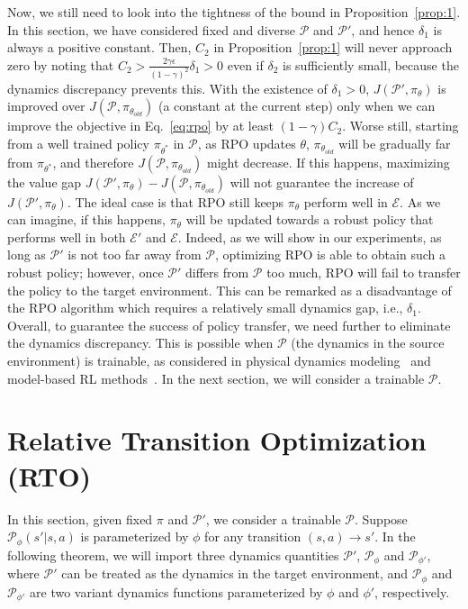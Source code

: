 \documentclass[letterpaper]{article} %
\def\P{{\mathcal{P}}}
\begin{document}
Now, we still need to look into the tightness of the bound in Proposition~\ref{prop:1}. In this section, we have considered fixed and diverse $\P$ and $\P'$, and hence $\delta_1$ is always a positive constant. Then, $C_2$ in Proposition~\ref{prop:1} will never approach zero by noting that $C_2>\frac{2\gamma\epsilon}{(1-\gamma)^2}\delta_1>0$ even if $\delta_2$ is sufficiently small, because the dynamics discrepancy prevents this. With the existence of $\delta_1>0$, $J(\P',\pi_{\theta})$ is improved over $J(\P,\pi_{\theta_{old}})$ (a constant at the current step) only when we can improve the objective in Eq.~\eqref{eq:rpo} by at least $(1-\gamma)C_2$.
Worse still, starting from a well trained policy $\pi_{\theta^*}$ in $\P$, as RPO updates $\theta$, $\pi_{\theta_{old}}$ will be gradually far from $\pi_{\theta^*}$, and therefore $J(\P,\pi_{\theta_{old}})$ might decrease. If this happens, maximizing the value gap $J(\P',\pi_{\theta})-J(\P,\pi_{\theta_{old}})$ will not guarantee the increase of $J(\P',\pi_{\theta})$.
The ideal case is that RPO still keeps $\pi_{\theta}$ perform well in $\mathcal{E}$.
As we can imagine, if this happens, $\pi_{\theta}$ will be updated towards a robust policy that performs well in both $\mathcal{E}'$ and $\mathcal{E}$.
Indeed, as we will show in our experiments, as long as $\P'$ is not too far away from $\P$, optimizing RPO is able to obtain such a robust policy; however, once $\P'$ differs from $\P$ too much, RPO will fail to transfer the policy to the target environment. This can be remarked as a disadvantage of the RPO algorithm which requires a relatively small dynamics gap, i.e., $\delta_1$.
Overall, to guarantee the success of policy transfer, we need further to eliminate the dynamics discrepancy.
This is possible when $\P$ (the dynamics in the source environment) is trainable, as considered in physical dynamics modeling~\citep{hu2020difftaichi,brax2021github,werling2021fast} and model-based RL methods~\citep{janner2019trust}. In the next section, we will consider a trainable $\P$.



\section{Relative Transition Optimization (RTO)}
\label{sec:rto}
In this section, given fixed $\pi$ and $\P'$, we consider a trainable $\P$. Suppose $\P_{\phi}(s'|s,a)$ is parameterized by $\phi$ for any transition $(s,a)\xrightarrow{}s'$. In the following theorem, we will import three dynamics quantities $\P'$, $\P_{\phi}$ and $\P_{\phi'}$, where $\P'$ can be treated as the dynamics in the target environment, and $\P_{\phi}$ and $\P_{\phi'}$ are two variant dynamics functions parameterized by $\phi$ and $\phi'$, respectively.
\end{document}
